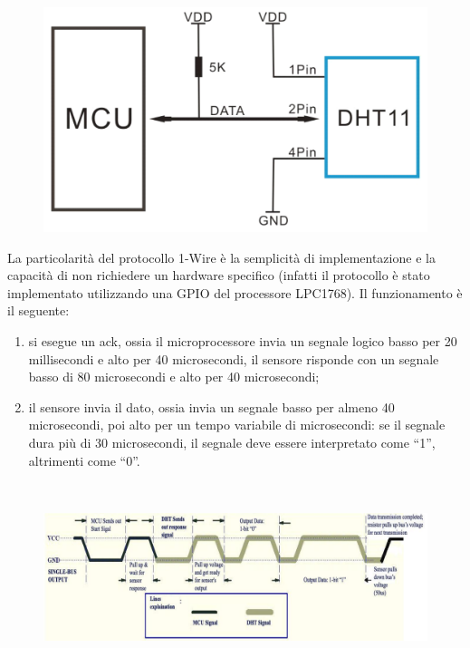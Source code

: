 \documentclass[a4paper,titlepage]{book}
\begin{document}
\begin{figure}[!ht]
\centering
\includegraphics[scale=0.6]{DHT11_collegamento.png}
\end{figure}


La particolarità del protocollo 1-Wire è la semplicità di implementazione e la capacità di non richiedere un hardware specifico (infatti il protocollo è stato implementato utilizzando una GPIO del processore LPC1768). Il funzionamento è il seguente: 

\begin{enumerate}

\item si esegue un ack, ossia il microprocessore invia un segnale logico basso per 20 millisecondi e alto per 40 microsecondi, il sensore risponde con un segnale basso di 80 microsecondi e alto per 40 microsecondi;

\item il sensore invia il dato, ossia invia un segnale basso per almeno 40 microsecondi, poi alto per un tempo variabile di microsecondi: se il segnale dura più di 30 microsecondi, il segnale deve essere interpretato come ``1'', altrimenti come ``0''.

\end{enumerate}

~

\begin{figure}[!ht]
\centering
\includegraphics[scale=1]{1wire.png}
\end{figure}
\end{document}
